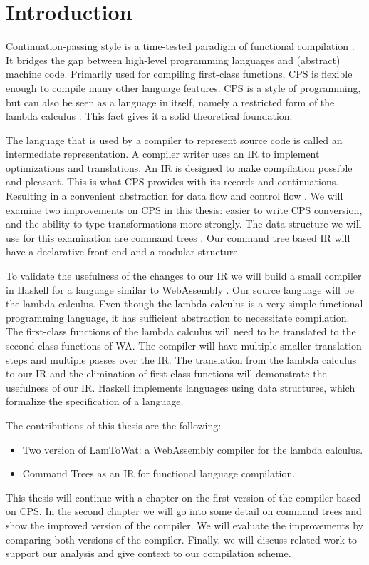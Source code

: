 
\chapter{\label{chap:introduction}Introduction}

Continuation-passing style is a time-tested paradigm of functional compilation \autocite{steele1978rabbit, DBLP:books/daglib/0022396}. It bridges the gap between high-level programming languages and (abstract) machine code. Primarily used for compiling first-class functions, CPS is flexible enough to compile many other language features. CPS is a style of programming, but can also be seen as a language in itself, namely a restricted form of the lambda calculus \autocite{barendregt1984lambda}. This fact gives it a solid theoretical foundation.

The language that is used by a compiler to represent source code is called an intermediate representation. A compiler writer uses an IR to implement optimizations and translations. An IR is designed to make compilation possible and pleasant. This is what CPS provides with its records and continuations. Resulting in a convenient abstraction for data flow and control flow \autocite{bruin2020framevm}. We will examine two improvements on CPS in this thesis: easier to write CPS conversion, and the ability to type transformations more strongly. The data structure we will use for this examination are command trees \autocite{commandtreespoulsen}. Our command tree based IR will have a declarative front-end and a modular structure.

To validate the usefulness of the changes to our IR we will build a small compiler in Haskell \autocite{haskellhomepage} for a language similar to WebAssembly \autocite{webassemblyhomepage}. Our source language will be the lambda calculus. Even though the lambda calculus is a very simple functional programming language, it has sufficient abstraction to necessitate compilation. The first-class functions of the lambda calculus will need to be translated to the second-class functions of WA. The compiler will have multiple smaller translation steps and multiple passes over the IR. The translation from the lambda calculus to our IR and the elimination of first-class functions will demonstrate the usefulness of our IR. Haskell implements languages using data structures, which formalize the specification of a language.

The contributions of this thesis are the following:
\begin{itemize}
\item Two version of LamToWat: a WebAssembly compiler for the lambda calculus.
\item Command Trees as an IR for functional language compilation.
\end{itemize}

This thesis will continue with a chapter on the first version of the compiler based on CPS. In the second chapter we will go into some detail on command trees and show the improved version of the compiler. We will evaluate the improvements by comparing both versions of the compiler. Finally, we will discuss related work to support our analysis and give context to our compilation scheme.